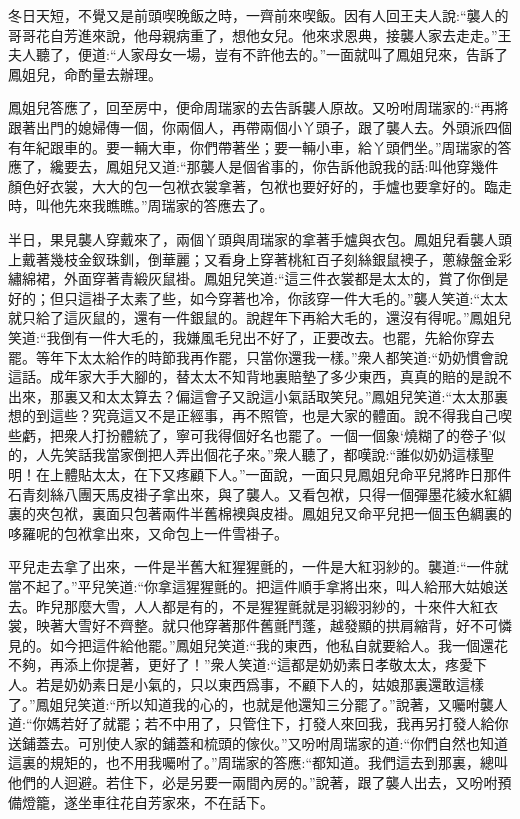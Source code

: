 \begin{parag}
    冬日天短，不覺又是前頭喫晚飯之時，一齊前來喫飯。因有人回王夫人說:“襲人的哥哥花自芳進來說，他母親病重了，想他女兒。他來求恩典，接襲人家去走走。”王夫人聽了，便道:“人家母女一場，豈有不許他去的。”一面就叫了鳳姐兒來，告訴了鳳姐兒，命酌量去辦理。
\end{parag}


\begin{parag}
    鳳姐兒答應了，回至房中，便命周瑞家的去告訴襲人原故。又吩咐周瑞家的:“再將跟著出門的媳婦傳一個，你兩個人，再帶兩個小丫頭子，跟了襲人去。外頭派四個有年紀跟車的。要一輛大車，你們帶著坐；要一輛小車，給丫頭們坐。”周瑞家的答應了，纔要去，鳳姐兒又道:“那襲人是個省事的，你告訴他說我的話:叫他穿幾件顏色好衣裳，大大的包一包袱衣裳拿著，包袱也要好好的，手爐也要拿好的。臨走時，叫他先來我瞧瞧。”周瑞家的答應去了。
\end{parag}


\begin{parag}
    半日，果見襲人穿戴來了，兩個丫頭與周瑞家的拿著手爐與衣包。鳳姐兒看襲人頭上戴著幾枝金釵珠釧，倒華麗；又看身上穿著桃紅百子刻絲銀鼠襖子，蔥綠盤金彩繡綿裙，外面穿著青緞灰鼠褂。鳳姐兒笑道:“這三件衣裳都是太太的，賞了你倒是好的；但只這褂子太素了些，如今穿著也冷，你該穿一件大毛的。”襲人笑道:“太太就只給了這灰鼠的，還有一件銀鼠的。說趕年下再給大毛的，還沒有得呢。”鳳姐兒笑道:“我倒有一件大毛的，我嫌風毛兒出不好了，正要改去。也罷，先給你穿去罷。等年下太太給作的時節我再作罷，只當你還我一樣。”衆人都笑道:“奶奶慣會說這話。成年家大手大腳的，替太太不知背地裏賠墊了多少東西，真真的賠的是說不出來，那裏又和太太算去？偏這會子又說這小氣話取笑兒。”鳳姐兒笑道:“太太那裏想的到這些？究竟這又不是正經事，再不照管，也是大家的體面。說不得我自己喫些虧，把衆人打扮體統了，寧可我得個好名也罷了。一個一個象‘燒糊了的卷子’似的，人先笑話我當家倒把人弄出個花子來。”衆人聽了，都嘆說:“誰似奶奶這樣聖明！在上體貼太太，在下又疼顧下人。”一面說，一面只見鳳姐兒命平兒將昨日那件石青刻絲八團天馬皮褂子拿出來，與了襲人。又看包袱，只得一個彈墨花綾水紅綢裏的夾包袱，裏面只包著兩件半舊棉襖與皮褂。鳳姐兒又命平兒把一個玉色綢裏的哆羅呢的包袱拿出來，又命包上一件雪褂子。
\end{parag}


\begin{parag}
    平兒走去拿了出來，一件是半舊大紅猩猩氈的，一件是大紅羽紗的。襲道:“一件就當不起了。”平兒笑道:“你拿這猩猩氈的。把這件順手拿將出來，叫人給邢大姑娘送去。昨兒那麼大雪，人人都是有的，不是猩猩氈就是羽緞羽紗的，十來件大紅衣裳，映著大雪好不齊整。就只他穿著那件舊氈鬥蓬，越發顯的拱肩縮背，好不可憐見的。如今把這件給他罷。”鳳姐兒笑道:“我的東西，他私自就要給人。我一個還花不夠，再添上你提著，更好了！”衆人笑道:“這都是奶奶素日孝敬太太，疼愛下人。若是奶奶素日是小氣的，只以東西爲事，不顧下人的，姑娘那裏還敢這樣了。”鳳姐兒笑道:“所以知道我的心的，也就是他還知三分罷了。”說著，又囑咐襲人道:“你媽若好了就罷；若不中用了，只管住下，打發人來回我，我再另打發人給你送鋪蓋去。可別使人家的鋪蓋和梳頭的傢伙。”又吩咐周瑞家的道:“你們自然也知道這裏的規矩的，也不用我囑咐了。”周瑞家的答應:“都知道。我們這去到那裏，總叫他們的人迴避。若住下，必是另要一兩間內房的。”說著，跟了襲人出去，又吩咐預備燈籠，遂坐車往花自芳家來，不在話下。
\end{parag}


